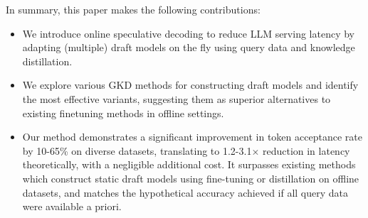 In summary, this paper makes the following contributions:
\begin{itemize}[leftmargin=*]
    \item We introduce online speculative decoding to reduce LLM serving latency by adapting (multiple) draft models on the fly using query data and knowledge distillation.
    \item We explore various GKD methods for constructing draft models and identify the most effective variants, suggesting them as superior alternatives to existing finetuning methods in offline settings.
    \item Our method demonstrates a significant improvement in token acceptance rate by 10-65\% on diverse datasets, translating to 1.2-3.1$\times$ reduction in latency theoretically, with a negligible additional cost. It surpasses existing methods which construct static draft models using fine-tuning or distillation on offline datasets, and matches the hypothetical accuracy achieved if all query data were available a priori.
\end{itemize}






